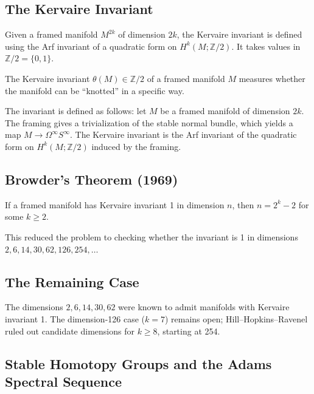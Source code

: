 \subsection{The Kervaire Invariant}

Given a framed manifold $M^{2k}$ of dimension $2k$, the Kervaire invariant is defined using the Arf invariant of a quadratic form on $H^k(M; \mathbb{Z}/2)$. It takes values in $\mathbb{Z}/2 = \{0, 1\}$.

\begin{definition}
The Kervaire invariant $\theta(M) \in \mathbb{Z}/2$ of a framed manifold $M$ measures whether the manifold can be ``knotted'' in a specific way.
\end{definition}

The invariant is defined as follows: let $M$ be a framed manifold of dimension $2k$. The framing gives a trivialization of the stable normal bundle, which yields a map $M \to \Omega^\infty S^\infty$. The Kervaire invariant is the Arf invariant of the quadratic form on $H^k(M; \mathbb{Z}/2)$ induced by the framing.

\subsection{Browder's Theorem (1969)}

\begin{theorem}
If a framed manifold has Kervaire invariant 1 in dimension $n$, then $n = 2^k - 2$ for some $k \geq 2$.
\end{theorem}

This reduced the problem to checking whether the invariant is 1 in dimensions $2, 6, 14, 30, 62, 126, 254, \ldots$

\subsection{The Remaining Case}

The dimensions $2, 6, 14, 30, 62$ were known to admit manifolds with Kervaire invariant 1. The dimension-126 case ($k=7$) remains open; Hill--Hopkins--Ravenel ruled out candidate dimensions for $k\geq8$, starting at 254.

\subsection{Stable Homotopy Groups and the Adams Spectral Sequence}

